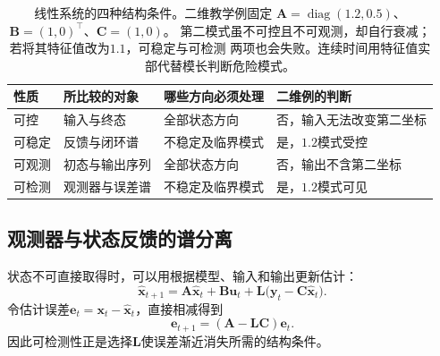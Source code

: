 \begin{table}[htbp]
  \centering
  \begin{tabularx}{\linewidth}{lXXX}
    \toprule
    性质 & 所比较的对象 & 哪些方向必须处理 & 二维例的判断\\
    \midrule
    可控 & 输入与终态 & 全部状态方向 & 否，输入无法改变第二坐标\\
    可稳定 & 反馈与闭环谱 & 不稳定及临界模式 & 是，$1.2$模式受控\\
    可观测 & 初态与输出序列 & 全部状态方向 & 否，输出不含第二坐标\\
    可检测 & 观测器与误差谱 & 不稳定及临界模式 & 是，$1.2$模式可见\\
    \bottomrule
  \end{tabularx}
  \caption{线性系统的四种结构条件。二维教学例固定
  $\bm A=\operatorname{diag}(1.2,0.5)$、$\bm B=(1,0)^\top$、$\bm C=(1,0)$。
  第二模式虽不可控且不可观测，却自行衰减；若将其特征值改为$1.1$，可稳定与可检测
  两项也会失败。连续时间用特征值实部代替模长判断危险模式。}
  \label{tab:control-structural-properties}
  \label{tab:control-structural-comparison}
\end{table}

\subsection{观测器与状态反馈的谱分离}
状态不可直接取得时，可以用根据模型、输入和输出更新估计：
\begin{equation}
  \widehat{\bm{x}}_{t+1}
  =
  \bm{A}\widehat{\bm{x}}_t+\bm{B}\bm{u}_t
  +
  \bm{L}\bigl(
    \bm{y}_t-\bm{C}\widehat{\bm{x}}_t
  \bigr).
  \label{eq:control-luenberger-observer}
\end{equation}
令估计误差$\bm{e}_t=\bm{x}_t-\widehat{\bm{x}}_t$，直接相减得到
\[
  \bm{e}_{t+1}
  =
  (\bm{A}-\bm{L}\bm{C})\bm{e}_t.
\]
因此可检测性正是选择$\bm{L}$使误差渐近消失所需的结构条件。

